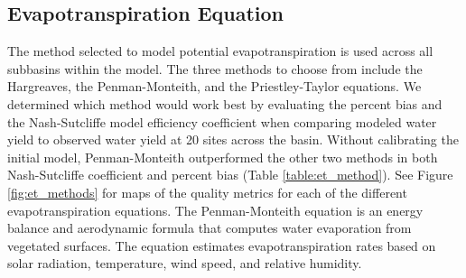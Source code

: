 
\subsection{Evapotranspiration Equation}\label{sec:et_methods}

The method selected to model potential evapotranspiration is used across all subbasins within the model.  The three methods to choose from include the Hargreaves, the Penman-Monteith, and the Priestley-Taylor equations.  We determined which method would work best by evaluating the percent bias and the Nash-Sutcliffe model efficiency coefficient  when comparing modeled water yield to observed water yield at 20 sites across the basin. Without calibrating the initial model, Penman-Monteith outperformed the other two methods in both Nash-Sutcliffe coefficient and percent bias (Table \ref{table:et_method}). See Figure \ref{fig:et_methods} for maps of the quality metrics for each of the different evapotranspiration equations. The Penman-Monteith equation is an energy balance and aerodynamic formula that computes water evaporation from vegetated surfaces. The equation estimates evapotranspiration rates based on solar radiation, temperature, wind speed, and relative humidity.
